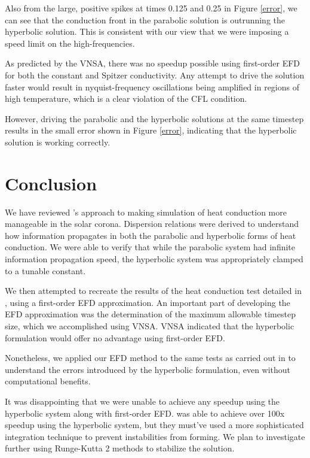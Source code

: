 \documentclass[iop]{emulateapj}
\begin{document}
		Also from the large, positive spikes at times 0.125 and 0.25 in Figure \ref{error}, we can see that the conduction front in the parabolic solution is outrunning the hyperbolic solution.
			This is consistent with our view that we were imposing a speed limit on the high-frequencies.
		
		As predicted by the VNSA, there was no speedup possible using first-order EFD for both the constant and Spitzer conductivity.
		Any attempt to drive the solution faster would result in nyquist-frequency oscillations being amplified in regions of high temperature, which is a clear violation of the CFL condition.
	
		However, driving the parabolic and the hyperbolic solutions at the same timestep results in the small error shown in Figure \ref{error}, indicating that the hyperbolic solution is working correctly.
	
	\section{Conclusion}
	
		We have reviewed 's approach to making simulation of heat conduction more manageable in the solar corona.
			Dispersion relations were derived to understand how information propagates in both the parabolic and hyperbolic forms of heat conduction.
			We were able to verify that while the parabolic system had infinite information propagation speed, the hyperbolic system was appropriately clamped to a tunable constant.
			
		We then attempted to recreate the results of the heat conduction test detailed in , using a first-order \ac{EFD} approximation.
			An important part of developing the \ac{EFD} approximation was the determination of the maximum allowable timestep size, which we accomplished using \ac{VNSA}.
			\ac{VNSA} indicated that the hyperbolic formulation would offer no advantage using first-order \ac{EFD}.
			
		Nonetheless, we applied our \ac{EFD} method to the same tests as carried out in  to understand the errors introduced by the hyperbolic formulation, even without computational benefits.
			
	
		It was disappointing that we were unable to achieve any speedup using the hyperbolic system along with first-order EFD. 
		 was able to achieve over 100x speedup using the hyperbolic system, but they must've used a more sophisticated integration technique to prevent instabilities from forming. 
		We plan to investigate further using Runge-Kutta 2 methods to stabilize the solution.
			
\end{document}
